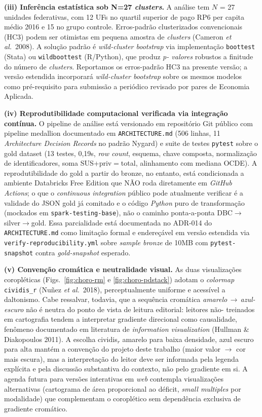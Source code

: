 \documentclass[12pt,a4paper,oneside]{article}
\begin{document}
\textbf{(iii) Inferência estatística sob N=27 \textit{clusters}.}
A análise tem $N$ = 27 unidades federativas, com 12 UFs no
quartil superior de pago RP6 per capita médio 2016
e 15 no grupo controle. Erros-padrão clusterizados convencionais
(HC3) podem ser otimistas em pequena amostra de \textit{clusters}
(Cameron \textit{et al.}\ 2008). A solução padrão é
\textit{wild-cluster bootstrap} via implementação \texttt{boottest}
(Stata) ou \texttt{wildboottest} (R/Python), que produz \textit{p-
valores} robustos a finitude do número de \textit{clusters}.
Reportamos os erros-padrão HC3 na presente versão; a versão
estendida incorporará \textit{wild-cluster bootstrap} sobre os
mesmos modelos como pré-requisito para submissão a periódico
revisado por pares de Economia Aplicada.

\textbf{(iv) Reprodutibilidade computacional verificada via
integração contínua.} O pipeline de análise está versionado em
repositório Git público com pipeline medallion documentado em
\texttt{ARCHITECTURE.md} (506 linhas, 11 \textit{Architecture
Decision Records} no padrão Nygard) e suite de testes
\texttt{pytest} sobre o gold dataset (13 testes, 0,19s,
\textit{row count}, esquema, chave composta, normalização de
identificadores, soma SUS+priv$=$total, alinhamento com mediana
OCDE). A reprodutibilidade do gold a partir do bronze, no entanto,
está condicionada a ambiente Databricks Free Edition que NÃO roda
diretamente em \textit{GitHub Actions}; o que o \textit{continuous
integration} público pode atualmente verificar é a validade do
JSON gold já comitado e o código \textit{Python} puro de
transformação (mockados em \texttt{spark-testing-base}), não o
caminho ponta-a-ponta DBC$\to$ silver$\to$gold. Essa parcialidade
está documentada no ADR-014 do \texttt{ARCHITECTURE.md} como
limitação formal e endereçável em versão estendida via
\texttt{verify-reproducibility.yml} sobre \textit{sample bronze}
de 10MB com \texttt{pytest-snapshot} contra \textit{gold-snapshot}
esperado.

\textbf{(v) Convenção cromática e neutralidade visual.} As duas
visualizações coropléticas (Figs.~\ref{fig:choro-rm} e
\ref{fig:choro-pdstack}) adotam o \textit{colormap} \texttt{cividis\_r}
(Nuñez \textit{et al.}\ 2018), perceptualmente uniforme e
acessível a daltonismo. Cabe ressalvar, todavia, que a sequência
cromática \textit{amarelo}\,$\to$\,\textit{azul-escuro} não é
neutra do ponto de vista de leitura editorial: leitores não-
treinados em cartografia tendem a interpretar gradiente
direcional como causalidade, fenômeno documentado em literatura de
\textit{information visualization} (Hullman \& Diakopoulos 2011).
A escolha cividis$_r$ \textemdash{} amarelo para baixa densidade,
azul escuro para alta \textemdash{} mantém a convenção do projeto
deste trabalho (maior valor $\to$ cor mais escura), mas a interpretação
do leitor deve ser informada pela legenda explícita e pela
discussão substantiva do contexto, não pelo gradiente em si. A
agenda futura para versões interativas em \textit{web} contempla
visualizações alternativas (cartograma de área proporcional ao
déficit, \textit{small multiples} por modalidade) que complementam
o coroplético sem dependência exclusiva de gradiente cromático.
\end{document}
